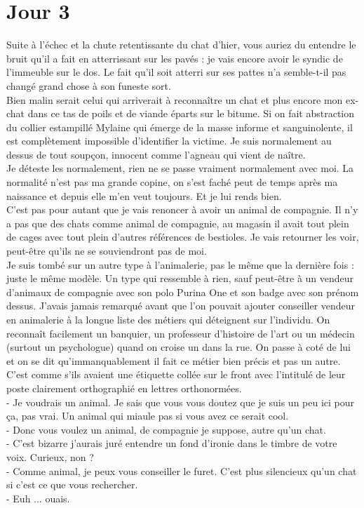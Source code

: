 \chapter*{Jour 3}
Suite à l'échec et la chute retentissante du chat d'hier, vous auriez du entendre le bruit qu'il a fait en atterrissant sur les pavés : je vais encore avoir le syndic de l'immeuble sur le dos. Le fait qu'il soit atterri sur ses pattes n'a semble-t-il pas changé grand chose à son funeste sort. \\
Bien malin serait celui qui arriverait à reconnaître un chat et plus encore mon ex-chat dans ce tas de poils et de viande éparts sur le bitume. Si on fait abstraction du collier estampillé Mylaine qui émerge de la masse informe et sanguinolente, il est complètement impossible d'identifier la victime. Je suis normalement au dessus de tout soupçon, innocent comme l'agneau qui vient de naître.\\

Je déteste les normalement, rien ne se passe vraiment normalement avec moi. La normalité n'est pas ma grande copine, on s'est faché peut de temps après ma naissance et depuis elle m'en veut toujours. Et je lui rends bien.\\

C'est pas pour autant que je vais renoncer à avoir un animal de compagnie. Il n'y a pas que des chats comme animal de compagnie, au magasin il avait tout plein de cages avec tout plein d'autres références de bestioles. Je vais retourner les voir, peut-être qu'ils ne se souviendront pas de moi. \\

Je suis tombé sur un autre type à l'animalerie, pas le même que la dernière fois : juste le même modèle. Un type qui ressemble à rien, sauf peut-être à un vendeur d'animaux de compagnie avec son polo Purina One et son badge avec son prénom dessus. J'avais jamais remarqué avant que l'on pouvait ajouter conseiller vendeur en animalerie à la longue liste des métiers qui déteignent sur l'individu. On reconnaît facilement un banquier, un professeur d'histoire de l'art ou un médecin (surtout un psychologue) quand on croise un dans la rue. On passe à coté de lui et on se dit qu'immanquablement il fait ce métier bien précis et pas un autre. C'est comme s'ils avaient une étiquette collée sur le front avec l’intitulé de leur poste clairement orthographié en lettres orthonormées. \\

- Je voudrais un animal. Je sais que vous vous doutez que je suis un peu ici pour ça, pas vrai. Un animal qui miaule pas si vous avez ce serait cool. \\
- Donc vous voulez un animal, de compagnie je suppose, autre qu'un chat. \\
- C'est bizarre j'aurais juré entendre un fond d'ironie dans le timbre de votre voix. Curieux, non ? \\
- Comme animal, je peux vous conseiller le furet. C'est plus silencieux qu'un chat si c'est ce que vous rechercher. \\
- Euh ... ouais.\\

